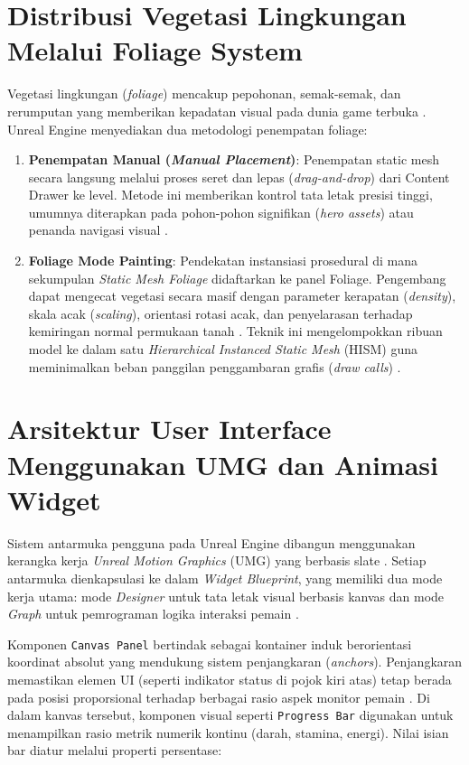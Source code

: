 \documentclass[a4paper,oneside,12pt]{report}
\begin{document}
\section{Distribusi Vegetasi Lingkungan Melalui Foliage System}
Vegetasi lingkungan (\textit{foliage}) mencakup pepohonan, semak-semak, dan rerumputan yang memberikan kepadatan visual pada dunia game terbuka \cite{epic-foliage-mode}. Unreal Engine menyediakan dua metodologi penempatan foliage:
\begin{enumerate}\setlength{\itemsep}{0.15em}\setlength{\parskip}{0pt}
	\item \textbf{Penempatan Manual (\textit{Manual Placement})}: Penempatan static mesh secara langsung melalui proses seret dan lepas (\textit{drag-and-drop}) dari Content Drawer ke level. Metode ini memberikan kontrol tata letak presisi tinggi, umumnya diterapkan pada pohon-pohon signifikan (\textit{hero assets}) atau penanda navigasi visual \cite{modul7}.
	\item \textbf{Foliage Mode Painting}: Pendekatan instansiasi prosedural di mana sekumpulan \textit{Static Mesh Foliage} didaftarkan ke panel Foliage. Pengembang dapat mengecat vegetasi secara masif dengan parameter kerapatan (\textit{density}), skala acak (\textit{scaling}), orientasi rotasi acak, dan penyelarasan terhadap kemiringan normal permukaan tanah \cite{epic-foliage-mode}. Teknik ini mengelompokkan ribuan model ke dalam satu \textit{Hierarchical Instanced Static Mesh} (HISM) guna meminimalkan beban panggilan penggambaran grafis (\textit{draw calls}) \cite{epic-foliage-mode}.
\end{enumerate}

\section{Arsitektur User Interface Menggunakan UMG dan Animasi Widget}
Sistem antarmuka pengguna pada Unreal Engine dibangun menggunakan kerangka kerja \textit{Unreal Motion Graphics} (UMG) yang berbasis slate \cite{epic-umg}. Setiap antarmuka dienkapsulasi ke dalam \textit{Widget Blueprint}, yang memiliki dua mode kerja utama: mode \textit{Designer} untuk tata letak visual berbasis kanvas dan mode \textit{Graph} untuk pemrograman logika interaksi pemain \cite{epic-umg}.

Komponen \texttt{Canvas Panel} bertindak sebagai kontainer induk berorientasi koordinat absolut yang mendukung sistem penjangkaran (\textit{anchors}). Penjangkaran memastikan elemen UI (seperti indikator status di pojok kiri atas) tetap berada pada posisi proporsional terhadap berbagai rasio aspek monitor pemain \cite{epic-umg}. Di dalam kanvas tersebut, komponen visual seperti \texttt{Progress Bar} digunakan untuk menampilkan rasio metrik numerik kontinu (darah, stamina, energi). Nilai isian bar diatur melalui properti persentase:
\end{document}

